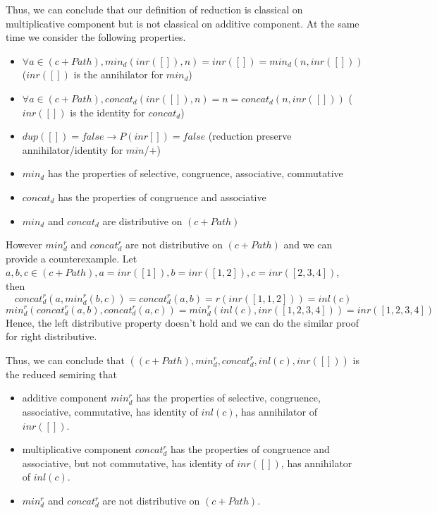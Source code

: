 \documentclass[a4paper,12pt,twoside,openright]{report}
\begin{document}
Thus, we can conclude that our definition of reduction is classical on multiplicative component but is not classical on additive component. At the same time we consider the following properties.
\begin{itemize}
  \item $\forall a \in (c + Path), min_d(inr([]),n) = inr([]) = min_d(n,inr([]))$ ($inr([])$ is the annihilator for $min_d$)
  \item $\forall a \in (c + Path), concat_d(inr([]),n) = n = concat_d(n,inr([]))$ ($inr([])$ is the identity for $concat_d$)
  \item $ dup([]) = false \rightarrow P(inr[]) = false$ (reduction preserve annihilator/identity for $min$/$+$)
  \item $min_d$ has the properties of selective, congruence, associative, commutative
  \item $concat_d$ has the properties of congruence and associative
  \item $min_d$ and $concat_d$ are distributive on $(c + Path)$
\end{itemize}

However $min^r_d$ and $concat^r_d$ are not distributive on $(c + Path)$ and we can provide a counterexample. Let $a,b,c \in (c + Path), a = inr([1]), b = inr([1,2]), c = inr([2,3,4])$, then 
\[concat^r_d (a,min^r_d(b,c)) = concat^r_d (a,b) = r(inr([1,1,2])) = inl(c)\]
\[min^r_d (concat^r_d(a,b),concat^r_d(a,c)) = min^r_d (inl(c),inr([1,2,3,4])) = inr([1,2,3,4])\]
Hence, the left distributive property doesn't hold and we can do the similar proof for right distributive.

Thus, we can conclude that $((c + Path),min^r_d,concat^r_d,inl(c),inr([]))$ is the reduced semiring that 
\begin{itemize}
  \item additive component $min^r_d$ has the properties of selective, congruence, associative, commutative, has identity of $inl(c)$, has annihilator of $inr([])$.
  \item multiplicative component $concat^r_d$ has the properties of congruence and associative, but not commutative, has identity of $inr([])$, has annihilator of $inl(c)$.
  \item $min^r_d$ and $concat^r_d$ are not distributive on $(c + Path)$.
\end{itemize}
\end{document}
